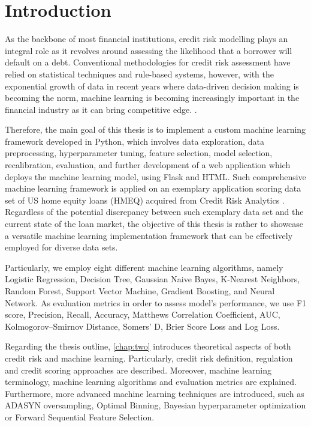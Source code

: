 \chapter{Introduction}
\label{chap:one}

As the backbone of most financial institutions, credit risk modelling plays an integral role as it  revolves around assessing the likelihood that a borrower will default on a debt.
Conventional methodologies for credit risk assessment have relied on statistical techniques and rule-based systems, however, with the exponential growth of data in recent years where data-driven decision making is becoming the norm, machine learning is becoming increasingly important in the financial industry as it can bring competitive edge. \citep{PwC2023}.


Therefore, the main goal of this thesis is to implement a custom machine learning framework developed in Python, which involves data exploration, data preprocessing, hyperparameter tuning, feature selection, model selection, recalibration, evaluation, and further development of a web application which deploys the machine learning model, using Flask and HTML.
Such comprehensive machine learning framework is applied on an exemplary application scoring data set of US home equity loans (HMEQ) acquired from Credit Risk Analytics \citep{baesens2016credit}.
Regardless of the potential discrepancy between such exemplary data set and the current state of the loan market, the objective of this thesis is rather to showcase a versatile machine learning implementation framework that can be effectively employed for diverse data sets.


Particularly, we employ eight different machine learning algorithms, namely Logistic Regression, Decision Tree, Gaussian Naive Bayes, K-Nearest Neighbors, Random Forest, Support Vector Machine, Gradient Boosting, and Neural Network.
As evaluation metrics in order to assess model's performance, we use F1 score, Precision, Recall, Accuracy, Matthews Correlation Coefficient, AUC, Kolmogorov--Smirnov Distance, Somers' D, Brier Score Loss and Log Loss.


Regarding the thesis outline, \autoref{chap:two} introduces theoretical aspects of both credit risk  and machine learning. Particularly, credit risk definition, regulation and credit scoring approaches are described. Moreover, machine learning terminology, machine learning algorithms and evaluation metrics are explained.
Furthermore, more advanced machine learning techniques are introduced, such as ADASYN oversampling, Optimal Binning, Bayesian hyperparameter optimization or Forward Sequential Feature Selection.

